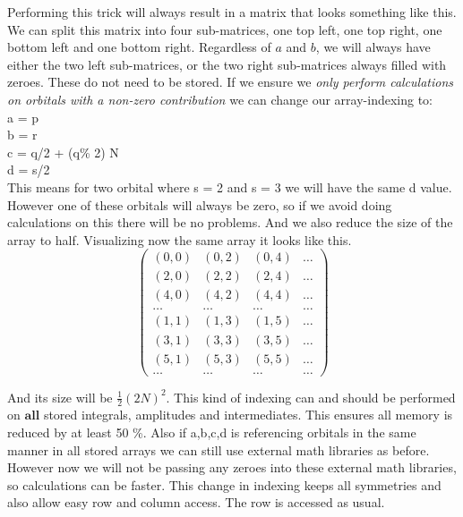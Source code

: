 Performing this trick will always result in a matrix that looks something like this. We can split this matrix into four sub-matrices, one top left, one top right, one bottom left and one bottom right. Regardless of $a$ and $b$, we will always have either the two left sub-matrices, or the two right sub-matrices always filled with zeroes. These do not need to be stored. If we ensure we \emph{only perform calculations on orbitals with a non-zero contribution} we can change our array-indexing to:\\
a = p\\
b = r\\
c = q/2 + (q\% 2) N\\
d = s/2 \\

This means for two orbital where s = 2 and s = 3 we will have the same d value. However one of these orbitals will always be zero, so if we avoid doing calculations on this there will be no problems. And we also reduce the size of the array to half. Visualizing now the same array it looks like this.
\[ \left( \begin{array}{cccc}
(0,0) & (0,2) & (0,4) & \dots \\
(2,0) & (2,2) & (2,4) & \dots \\
(4,0) & (4,2) & (4,4) & \dots \\
\dots & \dots & \dots & \dots \\
(1,1) & (1,3) & (1,5) & \dots \\
(3,1) & (3,3) & (3,5) & \dots \\
(5,1) & (5,3) & (5,5) & \dots \\
\dots & \dots & \dots & \dots  \end{array} \right)\]

And its size will be $\frac{1}{2} (2N)^2$. This kind of indexing can and should be performed on $\textbf{all}$ stored integrals, amplitudes and intermediates. This ensures all memory is reduced by at least 50 \%. Also if a,b,c,d is referencing orbitals in the same manner in all stored arrays we can still use external math libraries as before. However now we will not be passing any zeroes into these external math libraries, so calculations can be faster. This change in indexing keeps all symmetries and also allow easy row and column access. The row is accessed as usual.

